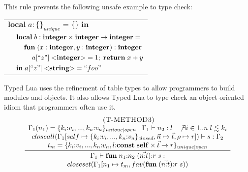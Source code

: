 This rule prevents the following unsafe example to type check:
\begin{center}
\begin{tabular}{llll}
\multicolumn{4}{l}{$\mathbf{local} \; a:\{\}_{unique} = \{\} \; \mathbf{in}$}\\
& \multicolumn{3}{l}{$\mathbf{local} \; b:\mathbf{integer} \times \mathbf{integer} \rightarrow \mathbf{integer} =$}\\
& & \multicolumn{2}{l}{$\mathbf{fun} \; (x:\mathbf{integer}, y:\mathbf{integer}):\mathbf{integer}$}\\
& & & \multicolumn{1}{l}{$a[``z"] \; {<}\mathbf{integer}{>} = 1; \; \mathbf{return} \; x + y$}\\
& \multicolumn{3}{l}{$\mathbf{in} \; a[``z"] \; {<}\mathbf{string}{>} = ``foo"$}
\end{tabular}
\end{center}

Typed Lua uses the refinement of table types to allow programmers to
build modules and objects.
It also allows Typed Lua to type check an object-oriented idiom that
programmers often use it.
\[
\begin{array}{c}
\; (\textsc{T-METHOD3})\\
\dfrac{\begin{array}{c}
       \Gamma_{1}(n_{1}) = \{k_{i}{:}v_{i}, ..., k_{n}{:}v_{n}\}_{unique|open} \;\;\;
       \Gamma_{1} \vdash n_{2} : l \;\;\;
       \not \exists i \in 1..n \; l \lesssim k_{i}\\
       closeall(\Gamma_{1}[self \mapsto \{k_{i}{:}v_{i}, ..., k_{n}{:}v_{n}\}_{closed}, \vec{n} \mapsto \vec{t}, \rho \mapsto r]) \vdash s:\Gamma_{2}\\
       t_{m} = \{k_{i}{:}v_{i}, ..., k_{n}{:}v_{n}, l{:}\mathbf{const} \; \mathbf{self} \times \vec{t} \rightarrow r\}_{unique|open}
       \end{array}}
      {\begin{array}{c}
       \Gamma_{1} \vdash \mathbf{fun} \; n_{1}{:}n_{2} \; (\vec{n{:}t}){:}r \; s:\\
       closeset(\Gamma_{1}[n_{1} \mapsto t_{m}, fav(\mathbf{fun} \; (\vec{n{:}t}){:}r \; s))
       \end{array}}
\end{array}
\]

